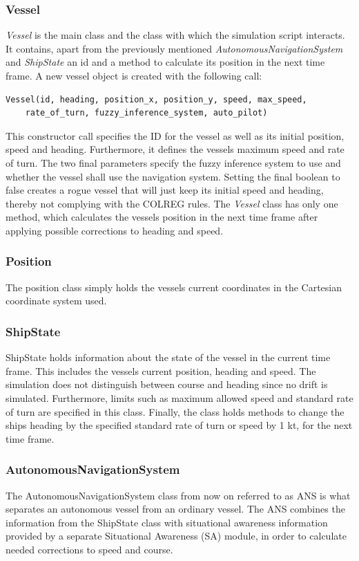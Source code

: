 \subsubsection{Vessel}
\textit{Vessel} is the main class and the class with which the simulation script interacts.
It contains, apart from the previously mentioned \textit{AutonomousNavigationSystem} and \textit{ShipState} an id and a method to calculate its position in the next time frame.
A new vessel object is created with the following call:
\begin{verbatim}
Vessel(id, heading, position_x, position_y, speed, max_speed, 
    rate_of_turn, fuzzy_inference_system, auto_pilot)
\end{verbatim}
This constructor call specifies the ID for the vessel as well as its initial position, speed and heading. Furthermore, it defines the vessels maximum speed and rate of turn. The two final parameters specify the fuzzy inference system to use and whether the vessel shall use the navigation system. Setting the final boolean to false creates a rogue vessel that will just keep its initial speed and heading, thereby not complying with the COLREG rules. The \textit{Vessel} class has only one method, which calculates the vessels position in the next time frame after applying possible corrections to heading and speed.
\subsubsection{Position}
The position class simply holds the vessels current coordinates in the Cartesian coordinate system used.
\subsubsection{ShipState}
ShipState holds information about the state of the vessel in the current time frame. This includes the vessels current position, heading and speed. The simulation does not distinguish between course and heading since no drift is simulated.
Furthermore, limits such as maximum allowed speed and standard rate of turn are specified in this class. Finally, the class holds methods to change the ships heading by the specified standard rate of turn or speed by 1 kt, for the next time frame.


\subsubsection{AutonomousNavigationSystem}
\label{sec:ANS}
The AutonomousNavigationSystem class from now on referred to as ANS is what separates an autonomous vessel from an ordinary vessel. The ANS combines the information from the ShipState class with situational awareness information provided by a separate Situational Awareness (SA) module, in order to calculate needed corrections to speed and course.

